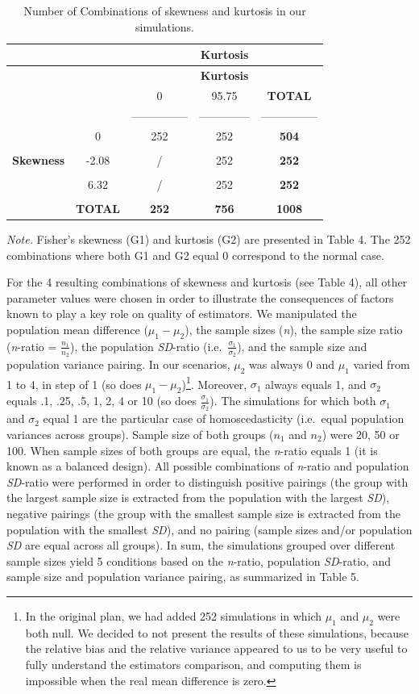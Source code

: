 \documentclass[
  man,floatsintext]{apa6}
\begin{document}
\newpage

\begin{longtable}[]{@{}ccccc@{}}
\caption{Number of Combinations of skewness and kurtosis in our simulations.}\tabularnewline
\toprule
& & & \textbf{Kurtosis} &\tabularnewline
\midrule
\endfirsthead
\toprule
& & & \textbf{Kurtosis} &\tabularnewline
\midrule
\endhead
& & 0 & 95.75 & \textbf{TOTAL}\tabularnewline
& & --------------- & -------------- & ---------------\tabularnewline
& 0 & 252 & 252 & \textbf{504}\tabularnewline
& & & &\tabularnewline
\textbf{Skewness} & -2.08 & / & 252 & \textbf{252}\tabularnewline
& & & &\tabularnewline
& 6.32 & / & 252 & \textbf{252}\tabularnewline
& & & &\tabularnewline
& \textbf{TOTAL} & \textbf{252} & \textbf{756} & \textbf{1008}\tabularnewline
\bottomrule
\end{longtable}

\emph{Note.} Fisher's skewness (G1) and kurtosis (G2) are presented in Table 4. The 252 combinations where both G1 and G2 equal 0 correspond to the normal case.

For the 4 resulting combinations of skewness and kurtosis (see Table 4), all other parameter values were chosen in order to illustrate the consequences of factors known to play a key role on quality of estimators. We manipulated the population mean difference (\(\mu_1-\mu_2\)), the sample sizes (\emph{n}), the sample size ratio (\emph{n}-ratio = \(\frac{n_1}{n_2}\)), the population \emph{SD}-ratio (i.e.~\(\frac{\sigma_1}{\sigma_2}\)), and the sample size and population variance pairing. In our scenarios, \(\mu_2\) was always 0 and \(\mu_1\) varied from 1 to 4, in step of 1 (so does \(\mu_1-\mu_2\))\footnote{In the original plan, we had added 252 simulations in which $\mu_1$ and $\mu_2$ were both null. We decided to not present the results of these simulations, because the relative bias and the relative variance appeared to us to be very useful to fully understand the estimators comparison, and computing them is impossible when the real mean difference is zero.}. Moreover, \(\sigma_1\) always equals 1, and \(\sigma_2\) equals .1, .25, .5, 1, 2, 4 or 10 (so does \(\frac{\sigma_1}{\sigma_2}\)). The simulations for which both \(\sigma_1\) and \(\sigma_2\) equal 1 are the particular case of homoscedasticity (i.e.~equal population variances across groups). Sample size of both groups (\(n_1\) and \(n_2\)) were 20, 50 or 100. When sample sizes of both groups are equal, the \emph{n}-ratio equals 1 (it is known as a balanced design). All possible combinations of \emph{n}-ratio and population \emph{SD}-ratio were performed in order to distinguish positive pairings (the group with the largest sample size is extracted from the population with the largest \emph{SD}), negative pairings (the group with the smallest sample size is extracted from the population with the smallest \emph{SD}), and no pairing (sample sizes and/or population \emph{SD} are equal across all groups). In sum, the simulations grouped over different sample sizes yield 5 conditions based on the \emph{n}-ratio, population \emph{SD}-ratio, and sample size and population variance pairing, as summarized in Table 5.
\end{document}
